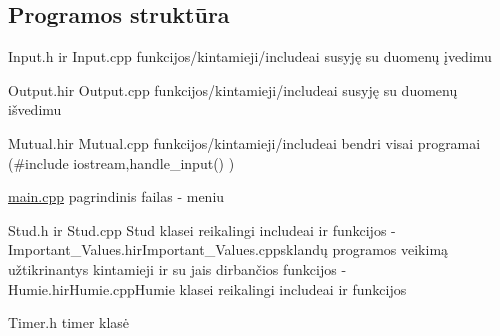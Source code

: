  \subsection*{Programos struktūra}


\begin{DoxyItemize}
\item {\ttfamily Input.\+h} ir {\ttfamily Input.\+cpp} funkcijos/kintamieji/include\textquotesingle{}ai susyję su duomenų įvedimu
\item {\ttfamily Output.\+h}ir {\ttfamily Output.\+cpp} funkcijos/kintamieji/include\textquotesingle{}ai susyję su duomenų išvedimu
\item {\ttfamily Mutual.\+h}ir {\ttfamily Mutual.\+cpp} funkcijos/kintamieji/include\textquotesingle{}ai bendri visai programai ({\ttfamily \#include iostream},{\ttfamily handle\+\_\+input()} )
\item {\ttfamily \mbox{\hyperlink{main_8cpp}{main.\+cpp}}} pagrindinis failas -\/ meniu
\item {\ttfamily Stud.\+h} ir {\ttfamily Stud.\+cpp} Stud klasei reikalingi include{\ttfamily ai ir funkcijos -\/}{\ttfamily Important\+\_\+\+Values.\+h}{\ttfamily ir}{\ttfamily Important\+\_\+\+Values.\+cpp}{\ttfamily sklandų programos veikimą užtikrinantys kintamieji ir su jais dirbančios funkcijos -\/}{\ttfamily Humie.\+h}{\ttfamily ir}{\ttfamily Humie.\+cpp}{\ttfamily Humie klasei reikalingi include}ai ir funkcijos
\item {\ttfamily Timer.\+h} timer klasė 
\end{DoxyItemize}